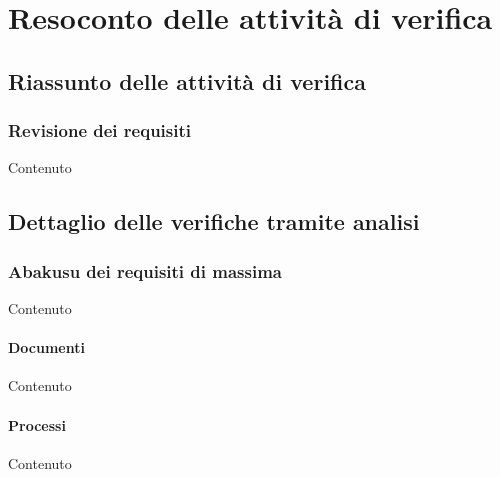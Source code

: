 \section{Resoconto delle attivit\`a di verifica}

    \subsection{Riassunto delle attivit\`a di verifica}

    \subsubsection{Revisione dei requisiti}
    Contenuto


    \subsection{Dettaglio delle verifiche tramite analisi}

    \subsubsection{Abakusu dei requisiti di massima}
    Contenuto

    \paragraph{Documenti}
    Contenuto

    \paragraph{Processi}
    Contenuto
